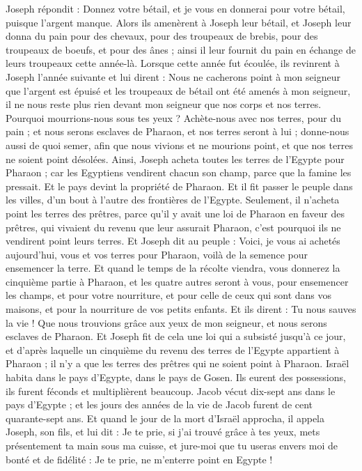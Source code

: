 \begin{multicols}{2}
Joseph répondit : Donnez votre bétail, et je vous en donnerai pour votre bétail, puisque l'argent manque.
Alors ils amenèrent à Joseph leur bétail, et Joseph leur donna du pain pour des chevaux, pour des troupeaux de brebis, pour des troupeaux de boeufs, et pour des ânes ; ainsi il leur fournit du pain en échange de leurs troupeaux cette année-là.
Lorsque cette année fut écoulée, ils revinrent à Joseph l'année suivante et lui dirent : Nous ne cacherons point à mon seigneur que l'argent est épuisé et les troupeaux de bétail ont été amenés à mon seigneur, il ne nous reste plus rien devant mon seigneur que nos corps et nos terres.
Pourquoi mourrions-nous sous tes yeux ? Achète-nous avec nos terres, pour du pain ; et nous serons esclaves de Pharaon, et nos terres seront à lui ; donne-nous aussi de quoi semer, afin que nous vivions et ne mourions point, et que nos terres ne soient point désolées.
Ainsi, Joseph acheta toutes les terres de l’Egypte pour Pharaon ; car les Egyptiens vendirent chacun son champ, parce que la famine les pressait. Et le pays devint la propriété de Pharaon.
Et il fit passer le peuple dans les villes, d’un bout à l’autre des frontières de l’Egypte.
Seulement, il n’acheta point les terres des prêtres, parce qu’il y avait une loi de Pharaon en faveur des prêtres, qui vivaient du revenu que leur assurait Pharaon, c’est pourquoi ils ne vendirent point leurs terres.
Et Joseph dit au peuple : Voici, je vous ai achetés aujourd'hui, vous et vos terres pour Pharaon, voilà de la semence pour ensemencer la terre.
Et quand le temps de la récolte viendra, vous donnerez la cinquième partie à Pharaon, et les quatre autres seront à vous, pour ensemencer les champs, et pour votre nourriture, et pour celle de ceux qui sont dans vos maisons, et pour la nourriture de vos petits enfants.
Et ils dirent : Tu nous sauves la vie ! Que nous trouvions grâce aux yeux de mon seigneur, et nous serons esclaves de Pharaon.
Et Joseph fit de cela une loi qui a subsisté jusqu’à ce jour, et d’après laquelle un cinquième du revenu des terres de l’Egypte appartient à Pharaon ; il n’y a que les terres des prêtres qui ne soient point à Pharaon.
Israël habita dans le pays d’Egypte, dans le pays de Gosen. Ils eurent des possessions, ils furent féconds et multiplièrent beaucoup.
Jacob vécut dix-sept ans dans le pays d’Egypte ; et les jours des années de la vie de Jacob furent de cent quarante-sept ans.
Et quand le jour de la mort d'Israël approcha, il appela Joseph, son fils, et lui dit : Je te prie, si j'ai trouvé grâce à tes yeux, mets présentement ta main sous ma cuisse, et jure-moi que tu useras envers moi de bonté et de fidélité : Je te prie, ne m'enterre point en Egypte !

\end{multicols}
